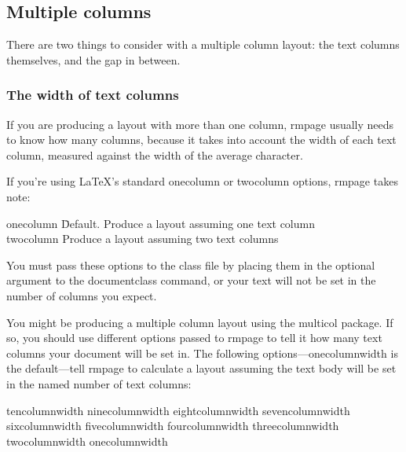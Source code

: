\documentclass[11pt,loose,twoside,touchwider,longish,
                      noheaders,a4paper,notstdmargins]{report}
\newcommand*{\packname}[1]{{\sffamily #1}}
\DeclareRobustCommand*{\comname}[1]{{\ttfamily\makeatletter\bs #1\makeatother}}
\newcommand*{\classname}[1]{{\ttfamily #1}}
\newcommand*{\optname}[1]{{\ttfamily #1}}
\newcommand*{\rmpage}{\classname{rmpage}\xspace}
\begin{document}
\subsection{Multiple columns}
\label{use:multiplecolumns}

There are two things to consider with a multiple column layout: the
text columns themselves, and the gap in between.

\subsubsection{The width of text columns}

If you are producing a layout with more than one column, \rmpage
usually needs to know how many columns, because it takes into account
the width of each text column, measured against the width of the
average character.

If you're using \LaTeX's standard \optname{onecolumn} or
\optname{twocolumn} options, \rmpage takes note:
\begin{tabbing}
\optname{onecolumn} \= Default. Produce a layout assuming one text column \\
\optname{twocolumn} \>  Produce a layout assuming two text columns
\end{tabbing}
You must pass these options to the class file by placing them in the
optional argument to the \comname{documentclass} command, or your text
will not be set in the number of columns you expect.

You might be producing a multiple column layout using the
\packname{multicol} package.  If so, you should use different options
passed to \rmpage to tell it how many text columns your document will
be set in.   The following options---\optname{onecolumnwidth} is the
default---tell \rmpage to calculate a layout
assuming the text body will be set in the named number of text columns:
\par
\vspace{\baselineskip}
\begin{raggedright}
\optname{tencolumnwidth}
\optname{ninecolumnwidth}
\optname{eightcolumnwidth}
\optname{sevencolumnwidth}
\optname{sixcolumnwidth}
\optname{fivecolumnwidth}
\optname{fourcolumnwidth}
\optname{threecolumnwidth}
\optname{twocolumnwidth}
\optname{onecolumnwidth}
\end{raggedright}
\vspace{\baselineskip}
\end{document}
